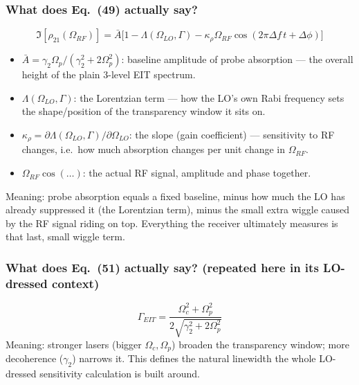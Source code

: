 \documentclass[11pt]{article}
\begin{document}
\subsubsection*{What does Eq.~(49) actually say?}
\[
\Im[\rho_{21}(\Omega_{RF})]=\bar A\big[1-\Lambda(\Omega_{LO},\Gamma) - \kappa_\rho\Omega_{RF}\cos(2\pi\Delta f\,t+\Delta\phi)\big]
\]
\begin{itemize}
\item $\bar A=\gamma_2\Omega_p/(\gamma_2^2+2\Omega_p^2)$: baseline amplitude of probe absorption --- the overall height of the plain 3-level EIT spectrum.
\item $\Lambda(\Omega_{LO},\Gamma)$: the Lorentzian term --- how the LO's own Rabi frequency sets the shape/position of the transparency window it sits on.
\item $\kappa_\rho=\partial\Lambda(\Omega_{LO},\Gamma)/\partial\Omega_{LO}$: the slope (gain coefficient) --- sensitivity to RF changes, i.e.\ how much absorption changes per unit change in $\Omega_{RF}$.
\item $\Omega_{RF}\cos(\dots)$: the actual RF signal, amplitude and phase together.
\end{itemize}
\begin{eqmeaning}
Meaning: probe absorption equals a fixed baseline, minus how much the LO has already suppressed it (the Lorentzian term), minus the small extra wiggle caused by the RF signal riding on top. Everything the receiver ultimately measures is that last, small wiggle term.
\end{eqmeaning}

\subsubsection*{What does Eq.~(51) actually say? (repeated here in its LO-dressed context)}
\[
\Gamma_{EIT}=\frac{\Omega_c^2+\Omega_p^2}{2\sqrt{\gamma_2^2+2\Omega_p^2}}
\]
Meaning: stronger lasers (bigger $\Omega_c,\Omega_p$) broaden the transparency window; more decoherence ($\gamma_2$) narrows it. This defines the natural linewidth the whole LO-dressed sensitivity calculation is built around.
\end{document}
